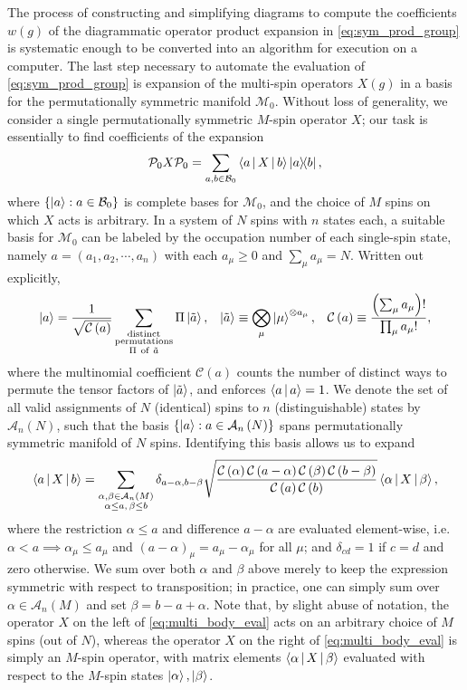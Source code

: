 \documentclass[nofootinbib,notitlepage,11pt]{revtex4-2}
\renewcommand{\t}{\text} %
\newcommand{\f}[2]{\dfrac{#1}{#2}} %
\newcommand{\p}[1]{\left(#1\right)} %
\renewcommand{\set}[1]{\left\{#1\right\}} %
\newcommand{\bk}{\Braket} %
\newcommand{\1}{\mathds{1}}
\newcommand{\A}{\mathcal{A}}
\newcommand{\B}{\mathcal{B}}
\newcommand{\C}{\mathcal{C}}
\newcommand{\M}{\mathcal{M}}
\renewcommand{\P}{\mathcal{P}}
\begin{document}
The process of constructing and simplifying diagrams to compute the
coefficients $w\p{g}$ of the diagrammatic operator product expansion
in \eqref{eq:sym_prod_group} is systematic enough to be converted into
an algorithm for execution on a computer.  The last step necessary to
automate the evaluation of \eqref{eq:sym_prod_group} is expansion of
the multi-spin operators $X\p{g}$ in a basis for the permutationally
symmetric manifold $\M_0$.  Without loss of generality, we consider a
single permutationally symmetric $M$-spin operator $X$; our task is
essentially to find coefficients of the expansion
\begin{align}
  \P_0 X \P_0
  = \sum_{a,b\in\B_0} \bk{a|X|b} \op{a}{b},
\end{align}
where $\set{\ket{a}:a\in\B_0}$ is complete bases for $\M_0$, and the
choice of $M$ spins on which $X$ acts is arbitrary.  In a system of
$N$ spins with $n$ states each, a suitable basis for $\M_0$ can be
labeled by the occupation number of each single-spin state, namely
$a=\p{a_1,a_2,\cdots,a_n}$ with each $a_\mu\ge 0$ and
$\sum_\mu a_\mu=N$.  Written out explicitly,
\begin{align}
  \ket{a} = \f1{\sqrt{\C\p{a}}}
  \sum_{\substack{\t{distinct}\\\t{permutations}\\\Pi~\t{of}~\tilde a}}
  \Pi \ket{\tilde a},
  &&
  \ket{\tilde a} \equiv \bigotimes_\mu \ket{\mu}^{\otimes a_\mu},
  &&
  \C\p{a} \equiv \f{\p{\sum_\mu a_\mu}!}{\prod_\mu a_\mu!},
\end{align}
where the multinomial coefficient $\C\p{a}$ counts the number of
distinct ways to permute the tensor factors of $\ket{\tilde a}$, and
enforces $\bk{a|a}=1$.  We denote the set of all valid assignments of
$N$ (identical) spins to $n$ (distinguishable) states by $\A_n\p{N}$,
such that the basis $\set{\ket{a}:a\in\A_n\p{N}}$ spans
permutationally symmetric manifold of $N$ spins.  Identifying this
basis allows us to expand
\begin{align}
  \bk{a|X|b}
  = \sum_{\substack{\alpha,\beta\in\A_n\p{M}\\\alpha\le a,\,\beta\le b}}
  \delta_{a-\alpha,b-\beta}
  \sqrt{\f{\C\p{\alpha}\C\p{a-\alpha}\C\p{\beta}\C\p{b-\beta}}
    {\C\p{a}\C\p{b}}}
  \bk{\alpha|X|\beta},
  \label{eq:multi_body_eval}
\end{align}
where the restriction $\alpha\le a$ and difference $a-\alpha$ are
evaluated element-wise, i.e.~$\alpha<a\implies \alpha_\mu\le a_\mu$
and $\p{a-\alpha}_\mu=a_\mu-\alpha_\mu$ for all $\mu$; and
$\delta_{cd}=1$ if $c=d$ and zero otherwise.  We sum over both
$\alpha$ and $\beta$ above merely to keep the expression symmetric
with respect to transposition; in practice, one can simply sum over
$\alpha\in\A_n\p{M}$ and set $\beta=b-a+\alpha$.  Note that, by slight
abuse of notation, the operator $X$ on the left of
\eqref{eq:multi_body_eval} acts on an arbitrary choice of $M$ spins
(out of $N$), whereas the operator $X$ on the right of
\eqref{eq:multi_body_eval} is simply an $M$-spin operator, with matrix
elements $\bk{\alpha|X|\beta}$ evaluated with respect to the $M$-spin
states $\ket\alpha,\ket\beta$.
\end{document}
